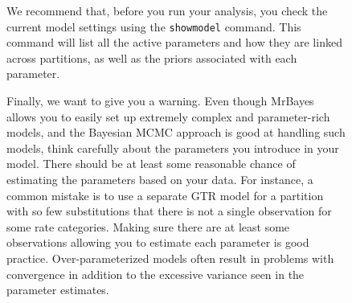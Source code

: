 \documentclass[12pt]{book}
\newcommand{\ttt}[1]{\texttt{#1}}
\begin{document}
\begin{figure}[h]
We recommend that, before you run your analysis, you check the current model settings using the
\ttt{showmodel} command. This command will list all the active parameters and how they are linked
across partitions, as well as the priors associated with each parameter.

Finally, we want to give you a warning. Even though MrBayes allows you to easily set up extremely
complex and parameter-rich models, and the Bayesian MCMC approach is good at handling such models,
think carefully about the parameters you introduce in your model. There should be at least some
reasonable chance of estimating the parameters based on your data. For instance, a common mistake
is to use a separate GTR model for a partition with so few substitutions that there is not a single
observation for some rate categories. Making sure there are at least some observations allowing you
to estimate each parameter is good practice. Over-parameterized models often result in problems
with convergence in addition to the excessive variance seen in the parameter estimates.

\appendix

\end{figure}
\end{document}
